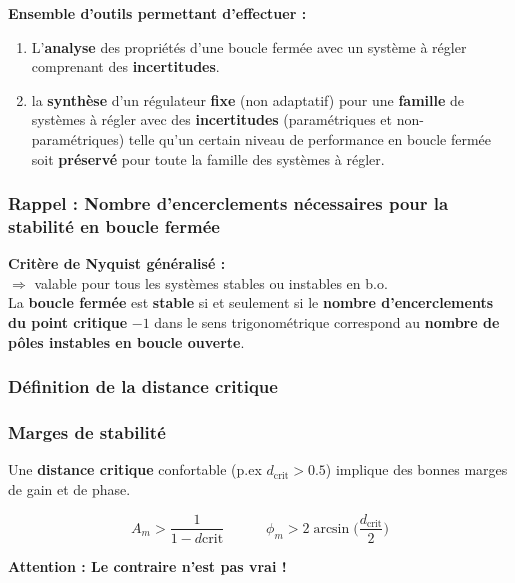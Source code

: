 \documentclass[document.tex]{subfiles}
\begin{document}
\textbf{Ensemble d'outils permettant d'effectuer :}\\

\begin{enumerate}
\item L'\textbf{analyse} des propriétés d'une boucle fermée avec un système à régler comprenant des \textbf{incertitudes}.
\item la \textbf{synthèse} d'un régulateur \textbf{fixe} (non adaptatif) pour une \textbf{famille} de systèmes à régler avec des \textbf{incertitudes} (paramétriques et non-paramétriques) telle qu'un certain niveau de performance en boucle fermée soit \textbf{préservé} pour toute la famille des systèmes à régler.
\end{enumerate}

\subsubsection{Rappel : Nombre d'encerclements nécessaires pour la stabilité en boucle fermée}

\textbf{Critère de Nyquist généralisé : }\\

$\Rightarrow$ valable pour tous les systèmes stables ou instables en b.o.\\
La \textbf{boucle fermée} est \textbf{stable} si et seulement si le \textbf{nombre
d'encerclements du point critique} $-1$ dans le sens trigonométrique correspond au \textbf{nombre de pôles instables en boucle ouverte}.


\subsubsection{Définition de la distance critique}


\subsubsection{Marges de stabilité}

Une \textbf{distance critique} confortable (p.ex $d_{\text{crit}} > 0.5$) implique des 
bonnes marges de gain et de phase.

$$
\boxed{ A_m > \dfrac{1}{1-d{\text{crit}}}} \quad \quad \quad \boxed{\phi_m > 2 \arcsin\bigg( \dfrac{d_{\text{crit}}}{2} \bigg)}
$$

\textbf{Attention : Le contraire n'est pas vrai !}\\
\end{document}
